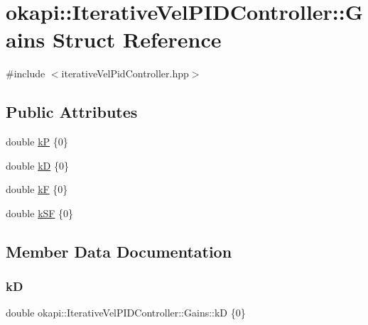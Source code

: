 \hypertarget{structokapi_1_1IterativeVelPIDController_1_1Gains}{}\section{okapi\+::Iterative\+Vel\+P\+I\+D\+Controller\+::Gains Struct Reference}
\label{structokapi_1_1IterativeVelPIDController_1_1Gains}


{\ttfamily \#include $<$iterative\+Vel\+Pid\+Controller.\+hpp$>$}

\subsection*{Public Attributes}
\begin{DoxyCompactItemize}
\item 
double \mbox{\hyperlink{structokapi_1_1IterativeVelPIDController_1_1Gains_a2c9a15d8ae4cd165fda3a1464debffcf}{kP}} \{0\}
\item 
double \mbox{\hyperlink{structokapi_1_1IterativeVelPIDController_1_1Gains_a78f7915e215ba90882a0ae0e7e91e181}{kD}} \{0\}
\item 
double \mbox{\hyperlink{structokapi_1_1IterativeVelPIDController_1_1Gains_acb243343a08960737a7211f350ecd795}{kF}} \{0\}
\item 
double \mbox{\hyperlink{structokapi_1_1IterativeVelPIDController_1_1Gains_af53bcd56585d99282ce99531b92ddf41}{k\+SF}} \{0\}
\end{DoxyCompactItemize}


\subsection{Member Data Documentation}
\mbox{\label{structokapi_1_1IterativeVelPIDController_1_1Gains_a78f7915e215ba90882a0ae0e7e91e181}} 
\subsubsection{\texorpdfstring{kD}{kD}}
{\footnotesize\ttfamily double okapi\+::\+Iterative\+Vel\+P\+I\+D\+Controller\+::\+Gains\+::kD \{0\}}

\mbox{\label{structokapi_1_1IterativeVelPIDController_1_1Gains_acb243343a08960737a7211f350ecd795}} 
